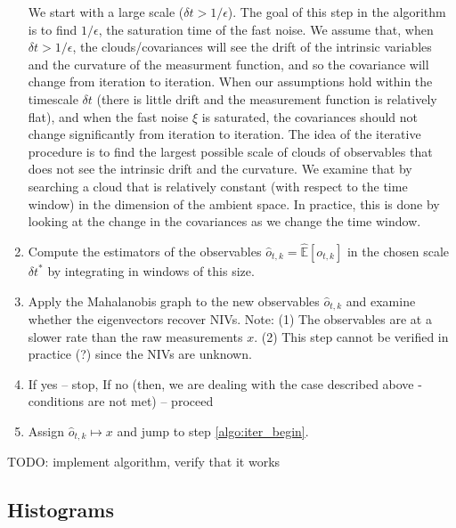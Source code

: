 \documentclass[12pt]{article}
\begin{document}
\begin{enumerate}
We start with a large scale ($\delta t > 1/\epsilon$). 
%
The goal of this step in the algorithm is to find $1/\epsilon$, the saturation time of the fast noise.
%
We assume that, when $\delta t > 1/\epsilon$, the clouds/covariances will see the drift of the intrinsic variables and the curvature of the measurment function, and so the covariance will change from iteration to iteration.
%
When our assumptions hold within the timescale $\delta t$ (there is little drift and the measurement function is relatively flat), and when the fast noise $\xi$ is saturated, the covariances should not change significantly from iteration to iteration. 
% 
 The idea of the iterative procedure is to find the largest possible scale of clouds of observables that does not see the intrinsic drift and the curvature. 
We examine that by searching a cloud that is relatively constant (with respect to the time window) in the dimension of the ambient space. 
%
In practice, this is done by looking at the change in the covariances as we change the time window.
	
	\item
	Compute the estimators of the observables $\hat{o}_{t,k} = \hat{\mathbb{E}}[o_{t,k}]$ in the chosen scale $\delta t^*$ by integrating in windows of this size.
	
     \item
	Apply the Mahalanobis graph to the new observables $\hat{o}_{t,k}$ and examine whether the eigenvectors recover NIVs. Note: (1) The observables are at a slower rate than the raw measurements $x$. (2) This step cannot be verified in practice (?) since the NIVs are unknown.

	\item
	If yes -- stop, If no (then, we are dealing with the case described above - conditions are not met) -- proceed
	
	\item
	Assign $\hat{o}_{t,k} \mapsto x$ and jump to step \ref{algo:iter_begin}.
	
\end{enumerate}

TODO: implement algorithm, verify that it works

\subsection{Histograms}
\end{document}

